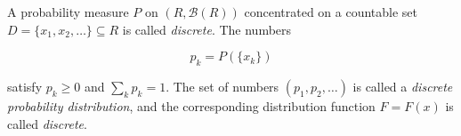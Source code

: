 A probability measure $P$ on $(R, \mathcal{B}(R))$ concentrated on a countable set $D = \{x_1, x_2, \ldots\} \subseteq R$ is called \textit{discrete}. The numbers

$$p_k = P(\{x_k\})$$

satisfy $p_k \geq 0$ and $\sum_{k} p_k = 1$. The set of numbers $(p_1, p_2, \ldots)$ is called a \textit{discrete probability distribution}, and the corresponding distribution function $F = F(x)$ is called \textit{discrete}.
